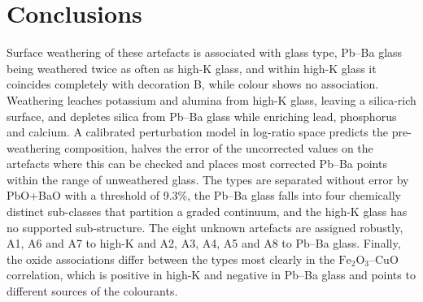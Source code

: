 \documentclass[11pt,a4paper]{article}
\newcommand{\ox}[1]{\ensuremath{\mathrm{#1}}}
\begin{document}
\section{Conclusions}
Surface weathering of these artefacts is associated with glass type, Pb--Ba glass being weathered twice as often as high-K glass, and within high-K glass it coincides completely with decoration B, while colour shows no association.
Weathering leaches potassium and alumina from high-K glass, leaving a silica-rich surface, and depletes silica from Pb--Ba glass while enriching lead, phosphorus and calcium.
A calibrated perturbation model in log-ratio space predicts the pre-weathering composition, halves the error of the uncorrected values on the artefacts where this can be checked and places most corrected Pb--Ba points within the range of unweathered glass.
The types are separated without error by PbO+BaO with a threshold of 9.3\%, the Pb--Ba glass falls into four chemically distinct sub-classes that partition a graded continuum, and the high-K glass has no supported sub-structure.
The eight unknown artefacts are assigned robustly, A1, A6 and A7 to high-K and A2, A3, A4, A5 and A8 to Pb--Ba glass.
Finally, the oxide associations differ between the types most clearly in the \ox{Fe_2O_3}--CuO correlation, which is positive in high-K and negative in Pb--Ba glass and points to different sources of the colourants.
\end{document}
